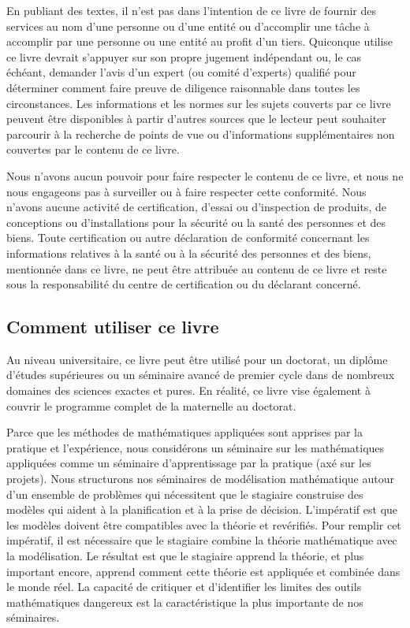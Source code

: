 	En publiant des textes, il n'est pas dans l'intention de ce livre de fournir des services au nom d'une personne ou d'une entit\'e ou d'accomplir une tâche à accomplir par une personne ou une entit\'e au profit d'un tiers. Quiconque utilise ce livre devrait s'appuyer sur son propre jugement ind\'ependant ou, le cas \'ech\'eant, demander l'avis d'un expert (ou comit\'e d'experts) qualifi\'e pour d\'eterminer comment faire preuve de diligence raisonnable dans toutes les circonstances. Les informations et les normes sur les sujets couverts par ce livre peuvent être disponibles à partir d'autres sources que le lecteur peut souhaiter parcourir à la recherche de points de vue ou d'informations suppl\'ementaires non couvertes par le contenu de ce livre.

	Nous n'avons aucun pouvoir pour faire respecter le contenu de ce livre, et nous ne nous engageons pas à surveiller ou à faire respecter cette conformit\'e. Nous n'avons aucune activit\'e de certification, d'essai ou d'inspection de produits, de conceptions ou d'installations pour la s\'ecurit\'e ou la sant\'e des personnes et des biens. Toute certification ou autre d\'eclaration de conformit\'e concernant les informations relatives à la sant\'e ou à la s\'ecurit\'e des personnes et des biens, mentionn\'ee dans ce livre, ne peut être attribu\'ee au contenu de ce livre et reste sous la responsabilit\'e du centre de certification ou du d\'eclarant concern\'e.

	\subsection{Comment utiliser ce livre}
	Au niveau universitaire, ce livre peut être utilis\'e pour un doctorat, un diplôme d'\'etudes sup\'erieures ou un s\'eminaire avanc\'e de premier cycle dans de nombreux domaines des sciences exactes et pures. En r\'ealit\'e, ce livre vise \'egalement à couvrir le programme complet de la maternelle au doctorat.

	Parce que les m\'ethodes de math\'ematiques appliqu\'ees sont apprises par la pratique et l'exp\'erience, nous consid\'erons un s\'eminaire sur les math\'ematiques appliqu\'ees comme un s\'eminaire d'apprentissage par la pratique (ax\'e sur les projets). Nous structurons nos s\'eminaires de mod\'elisation math\'ematique autour d'un ensemble de problèmes qui n\'ecessitent que le stagiaire construise des modèles qui aident à la planification et à la prise de d\'ecision. L'imp\'eratif est que les modèles doivent être compatibles avec la th\'eorie et rev\'erifi\'es. Pour remplir cet imp\'eratif, il est n\'ecessaire que le stagiaire combine la th\'eorie math\'ematique avec la mod\'elisation. Le r\'esultat est que le stagiaire apprend la th\'eorie, et plus important encore, apprend comment cette th\'eorie est appliqu\'ee et combin\'ee dans le monde r\'eel. La capacit\'e de critiquer et d'identifier les limites des outils math\'ematiques dangereux est la caract\'eristique la plus importante de nos s\'eminaires.

